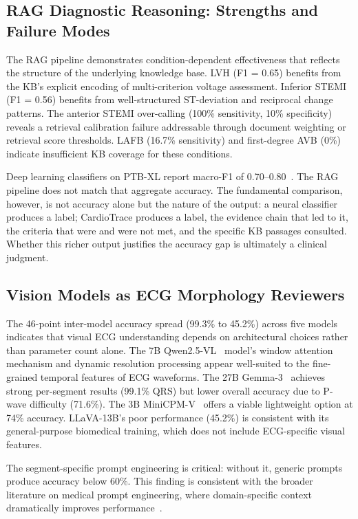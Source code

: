 \documentclass[journal,compsoc]{IEEEtran}
\newcommand{\system}{CardioTrace}
\begin{document}
\subsection{RAG Diagnostic Reasoning: Strengths and Failure Modes}

The RAG pipeline demonstrates condition-dependent effectiveness that reflects the structure of the underlying knowledge base. LVH (F1 = 0.65) benefits from the KB's explicit encoding of multi-criterion voltage assessment. Inferior STEMI (F1 = 0.56) benefits from well-structured ST-deviation and reciprocal change patterns. The anterior STEMI over-calling (100\% sensitivity, 10\% specificity) reveals a retrieval calibration failure addressable through document weighting or retrieval score thresholds. LAFB (16.7\% sensitivity) and first-degree AVB (0\%) indicate insufficient KB coverage for these conditions.

Deep learning classifiers on PTB-XL report macro-F1 of 0.70--0.80~\cite{strodthoff2021deep,wagner2020ptbxl}. The RAG pipeline does not match that aggregate accuracy. The fundamental comparison, however, is not accuracy alone but the nature of the output: a neural classifier produces a label; \system{} produces a label, the evidence chain that led to it, the criteria that were and were not met, and the specific KB passages consulted. Whether this richer output justifies the accuracy gap is ultimately a clinical judgment.

\subsection{Vision Models as ECG Morphology Reviewers}

The 46-point inter-model accuracy spread (99.3\% to 45.2\%) across five models indicates that visual ECG understanding depends on architectural choices rather than parameter count alone. The 7B Qwen2.5-VL~\cite{qwen25vl2025} model's window attention mechanism and dynamic resolution processing appear well-suited to the fine-grained temporal features of ECG waveforms. The 27B Gemma-3~\cite{gemma3_2025} achieves strong per-segment results (99.1\% QRS) but lower overall accuracy due to P-wave difficulty (71.6\%). The 3B MiniCPM-V~\cite{minicpmv2024} offers a viable lightweight option at 74\% accuracy. LLaVA-13B's poor performance (45.2\%) is consistent with its general-purpose biomedical training, which does not include ECG-specific visual features.

The segment-specific prompt engineering is critical: without it, generic prompts produce accuracy below 60\%. This finding is consistent with the broader literature on medical prompt engineering, where domain-specific context dramatically improves performance~\cite{ckepe2024,seki2025ecg_vqa}.
\end{document}
